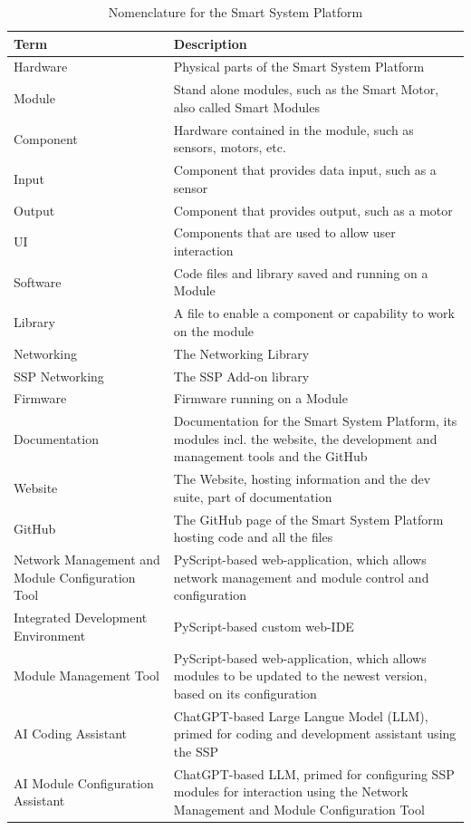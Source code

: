 \begin{table}[H]
    \centering
    \begin{tabular}{|p{125pt}|p{325pt}|}
    \hline
        \textbf{Term} & \textbf{Description} \\\hline
        Hardware        & Physical parts of the Smart System Platform \\\hline
        Module          & Stand alone modules, such as the Smart Motor, also called Smart Modules \\\hline
        Component       & Hardware contained in the module, such as sensors, motors, etc. \\\hline
        Input           & Component that provides data input, such as a sensor \\\hline
        Output          & Component that provides output, such as a motor \\\hline
        UI              & Components that are used to allow user interaction  \\\hline
        Software        & Code files and library saved and running on a Module \\\hline
        Library         & A file to enable a component or capability to work on the module \\\hline
        Networking      & The Networking Library \\\hline
        SSP Networking  & The SSP Add-on library\\\hline
        Firmware        & Firmware running on a Module \\\hline
        Documentation   & Documentation for the Smart System Platform, its modules incl. the website, the development and management tools and the GitHub \\\hline
        Website         & The Website, hosting information and the dev suite, part of documentation \\\hline
        GitHub          & The GitHub page of the Smart System Platform hosting code and all the files \\\hline
        Network Management and Module Configuration Tool & PyScript-based web-application, which allows network management and module control and configuration \\\hline
        Integrated Development Environment & PyScript-based custom web-IDE \\\hline
        Module Management Tool & PyScript-based web-application, which allows modules to be updated to the newest version, based on its configuration \\\hline
        AI Coding Assistant   & ChatGPT-based Large Langue Model (LLM), primed for coding and development assistant using the SSP \\\hline
        AI Module Configuration Assistant & ChatGPT-based LLM, primed for configuring SSP modules for interaction using the Network Management and Module Configuration Tool \\\hline
    \end{tabular}
    \vspace{\ftspace}
    \caption{Nomenclature for the Smart System Platform}
    \label{tab:nomenclature}
\end{table}


